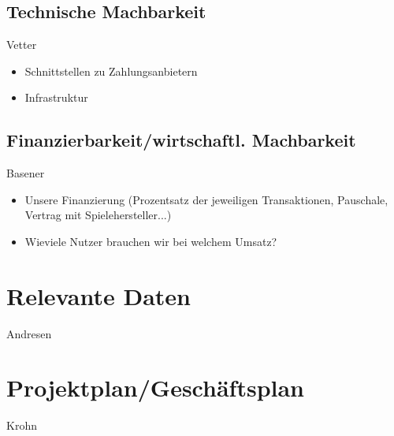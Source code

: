 \documentclass[a4paper,10pt]{article}
\begin{document}
\subsection{Technische Machbarkeit}
Vetter
\begin{itemize}
  \item Schnittstellen zu Zahlungsanbietern
  \item Infrastruktur
\end{itemize}

\subsection{Finanzierbarkeit/wirtschaftl. Machbarkeit}
Basener
\begin{itemize}
  \item Unsere Finanzierung (Prozentsatz der jeweiligen Transaktionen, Pauschale, Vertrag mit Spielehersteller...)
  \item Wieviele Nutzer brauchen wir bei welchem Umsatz?
\end{itemize}

\section{Relevante Daten}
Andresen

\section{Projektplan/Geschäftsplan}
Krohn
\end{document}
